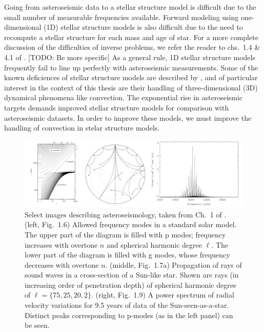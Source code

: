 Going from asteroseismic data to a stellar structure model is difficult due to the small number of measurable frequencies available.
Forward modeling using one-dimensional (1D) stellar structure models is also difficult due to the need to recompute a stellar structure for each mass and age of star.
For a more complete discussion of the difficulties of inverse problems, we refer the reader to chs.~1.4 \& 4.1 of \citet{bellingerT2018}.
[TODO: Be more specific] As a general rule, 1D stellar structure models frequently fail to line up perfectly with asteroseismic measurements.
Some of the known deficiences of stellar structure models are described by \cite{buldgen2019}, and of particular interest in the context of this thesis are their handling of three-dimensional (3D) dynamical phenomena like convection.
The exponential rise in asteroseismic targets demands improved stellar structure models for comparison with asteroseismic datasets.
In order to improve these models, we must improve the handling of convection in stelar structure models. 

\begin{figure}[ht]
\includegraphics[width=\textwidth]{./figs/intro/asteroseismology.pdf}
\caption[Solar velocity power spectra.]
{
	Select images describing asteroseismology, taken from Ch.~1 of \citet{aerts&all2010}.
	(left, Fig.~1.6) Allowed frequency modes in a standard solar model.
	The upper part of the diagram is filled with p modes; frequency increases with overtone $n$ and spherical harmonic degree $\ell$.
	The lower part of the diagram is filled with g modes, whose frequency decreases with overtone $n$.
	(middle, Fig.~1.7a) Propagation of rays of sound waves in a cross-section of a Sun-like star.
	Shown are rays (in increasing order of penetration depth) of spherical harmonic degree of $\ell = \{75, 25, 20, 2\}$.
	(right, Fig.~1.9) A power spectrum of radial velocity variations for 9.5 years of data of the Sun-seen-as-a-star.
	Distinct peaks corresponding to p-modes (as in the left panel) can be seen.
	\label{fig:asteroseismology} 
}
\end{figure}





